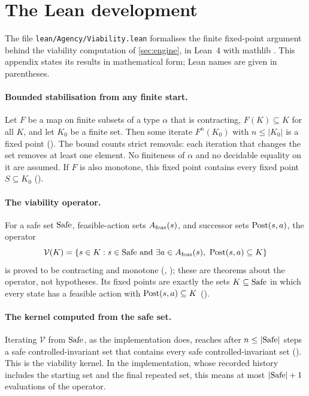 \section{The Lean development}
\label{app:lean_viability}

The file \texttt{lean/Agency/Viability.lean} formalises the finite fixed-point argument behind the viability computation of \cref{sec:engine}, in Lean~4 with mathlib \citep{demoura2021lean4,mathlib2019}. This appendix states its results in mathematical form; Lean names are given in parentheses.

\paragraph{Bounded stabilisation from any finite start.}
Let $F$ be a map on finite subsets of a type $\alpha$ that is contracting, $F(K)\subseteq K$ for all $K$, and let $K_0$ be a finite set. Then some iterate $F^n(K_0)$ with $n\le |K_0|$ is a fixed point (). The bound counts strict removals: each iteration that changes the set removes at least one element. No finiteness of $\alpha$ and no decidable equality on it are assumed. If $F$ is also monotone, this fixed point contains every fixed point $S\subseteq K_0$ ().

\paragraph{The viability operator.}
For a safe set $\mathrm{Safe}$, feasible-action sets $A_{\mathrm{feas}}(s)$, and successor sets $\mathrm{Post}(s,a)$, the operator
\[
\mathcal{V}(K)=\{s\in K : s\in\mathrm{Safe} \text{ and } \exists a\in A_{\mathrm{feas}}(s),\ \mathrm{Post}(s,a)\subseteq K\}
\]
is proved to be contracting and monotone (, ); these are theorems about the operator, not hypotheses. Its fixed points are exactly the sets $K\subseteq\mathrm{Safe}$ in which every state has a feasible action with $\mathrm{Post}(s,a)\subseteq K$ ().

\paragraph{The kernel computed from the safe set.}
Iterating $\mathcal{V}$ from $\mathrm{Safe}$, as the implementation does, reaches after $n\le|\mathrm{Safe}|$ steps a safe controlled-invariant set that contains every safe controlled-invariant set (). This is the viability kernel. In the implementation, whose recorded history includes the starting set and the final repeated set, this means at most $|\mathrm{Safe}|+1$ evaluations of the operator.

